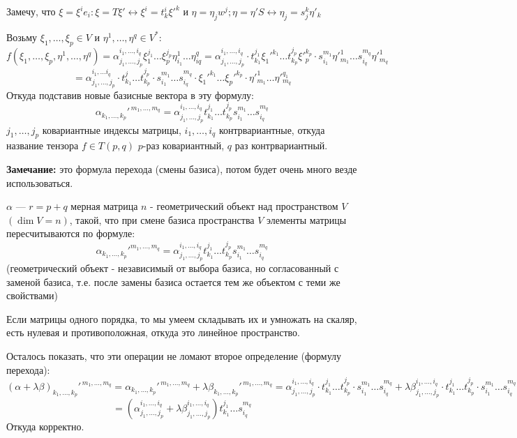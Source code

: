 Замечу, что $\xi =\xi^i e_i: \xi = T \xi' \leftrightarrow \xi^i = t_k^i\xi'^k$
и $\eta = \eta_j w^j; \eta = \eta'S \leftrightarrow \eta_j = s_{j}^k \eta'_k $

Возьму $\xi_1,\ldots,\xi_p \in V$ и $\eta^1,\ldots, \eta^q\in V^*$:
$$f(\xi_1,\ldots,\xi_p,\eta^1,\ldots,\eta^q)=\alpha^{i_1,\ldots,i_q}_{j_1,\ldots, j_p}\xi_1^{j_1}\ldots \xi_{p}^{j_p} \eta_{i_1}^1 \ldots \eta_{iq}^q =\alpha^{i_1,\ldots,i_q}_{j_1,\ldots, j_p} \cdot t_{k_1}^{j_1}\xi_1'^{k_1}\ldots t_{k_p}^{{j_p}}\xi'^{k_p}_p \cdot s_{i_1}^{m_1}\eta'^1_{m_1}\ldots s_{i_q}^{m_q}\eta'^1_{m_q}$$
$$= \alpha^{i_1,\ldots i_q}_{j_1,\ldots, j_p} \cdot t_{k_1}^{j}\ldots t_{k_p}^{j_p}\cdot s_{i_1}^{m_1}\ldots s_{i_q}^{m_q}\cdot \xi_1'^{k_1}\ldots \xi_{p}'^{k_p} \cdot \eta'^{1}_{m_1}\ldots \eta'^{q_1}_{m_q}$$
Откуда подставив новые базисные вектора в эту формулу:
$$\alpha_{k_1,\ldots,k_p}'^{\,m_1,\ldots, m_q} = \alpha_{j_1,\ldots,j_p}^{i_1,\ldots, i_q}t_{k_1}^{j_1}\ldots t_{k_p}^{j_p} s_{i_1}^{m_1}\ldots s_{i_q}^{m_q}$$
$j_1,\ldots, j_p$ ковариантные индексы матрицы, $i_1,\ldots, i_q$ контрвариантные, откуда название тензора $f\in T(p,q)$ $p$-раз ковариантный, $q$ раз контрвариантный.

\textbf{Замечание:} это формула перехода (смены базиса), потом будет очень много везде использоваться.


 $\alpha$ --- $r = p+q$ мерная матрица $n$ - геометрический объект над пространством $V$ $(\dim V =n)$, такой, что при смене базиса пространства $V$ элементы матрицы пересчитываются по формуле:
$$\alpha_{k_1,\ldots,k_p}'^{m_1,\ldots, m_q} = \alpha_{j_1,\ldots,j_p}^{i_1,\ldots, i_q}t_{k_1}^{j_1}\ldots t_{k_p}^{j_p} s_{i_1}^{m_1}\ldots s_{i_q}^{m_q}$$(геометрический объект - независимый от выбора базиса, но согласованный с заменой базиса, т.е. после замены базиса остается тем же объектом с теми же свойствами)

Если матрицы одного порядка, то мы умеем складывать их и умножать на скаляр, есть нулевая и противоположная, откуда это линейное пространство.  

Осталось показать, что эти операции не ломают второе определение (формулу перехода):
$$(\alpha + \lambda \beta)_{k_1,\ldots,k_p}'^{\,m_1,\ldots,m_q} = \alpha_{k_1,\ldots,k_p}'^{\, m_1,\ldots, m_q} + \lambda \beta_{k_1,\ldots,k_p}'^{\, m_1,\ldots, m_q} = \alpha_{j_1,\ldots,j_p}^{i_1,\ldots,i_q} \cdot t_{k_1}^{j_1} \ldots t_{k_p}^{j_p}\cdot s_{i_1}^{m_1}\ldots s_{i_q}^{m_q} + \lambda\beta_{j_1,\ldots,j_p}^{i_1,\ldots,i_q} \cdot t_{k_1}^{j_1} \ldots t_{k_p}^{j_p}\cdot s_{i_1}^{m_1}\ldots s_{i_q}^{m_q} $$
$$= (\alpha_{j_1,\ldots, j_p}^{i_1,\ldots,i_q} + \lambda \beta_{j_1,\ldots, j_p}^{i_1,\ldots,i_q})t_{k_1}^{j_1}\ldots s_{i_q}^{m_q}$$
Откуда корректно.

